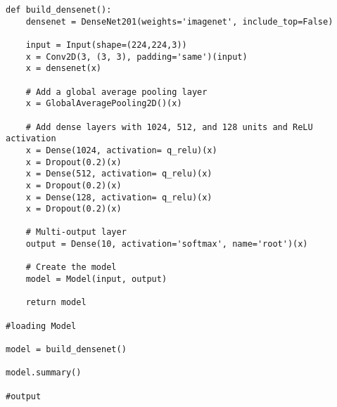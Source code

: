 \documentclass[12pt, English]{article}
\begin{document}
\begin{normalsize}
\begin{verbatim}
def build_densenet():
    densenet = DenseNet201(weights='imagenet', include_top=False)

    input = Input(shape=(224,224,3))
    x = Conv2D(3, (3, 3), padding='same')(input)
    x = densenet(x)

    # Add a global average pooling layer
    x = GlobalAveragePooling2D()(x)

    # Add dense layers with 1024, 512, and 128 units and ReLU activation
    x = Dense(1024, activation= q_relu)(x)
    x = Dropout(0.2)(x)
    x = Dense(512, activation= q_relu)(x)
    x = Dropout(0.2)(x)
    x = Dense(128, activation= q_relu)(x)
    x = Dropout(0.2)(x)

    # Multi-output layer
    output = Dense(10, activation='softmax', name='root')(x)

    # Create the model
    model = Model(input, output)

    return model

#loading Model

model = build_densenet()

model.summary()

#output


\end{verbatim}
\end{normalsize}
\end{document}
